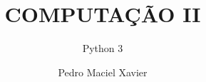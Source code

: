 \documentclass[br]{textbook}
\title{COMPUTAÇÃO II}
\author{Pedro Maciel Xavier}
\subtitle{Python 3}
\begin{document}
    \maketitlepage

    

    \frontmatter
    

    \mainmatter
    \tableofcontents

    
    
\end{document}
